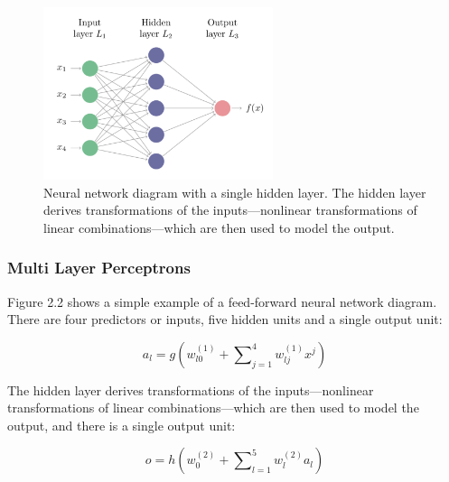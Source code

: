\begin{figure}[htbp]
\centering
\includegraphics[width=0.6\textwidth]{images/perceptron.png}
\caption{Neural network diagram with a single hidden layer. The hidden layer derives transformations of the inputs—nonlinear transformations of linear combinations—which are then used to model the output.}
\label{fig:perceptron}
\end{figure}

\subsubsection*{Multi Layer Perceptrons}

Figure 2.2 shows a simple example of a feed-forward neural network diagram. There are four predictors or inputs, five hidden units and a single output unit:

\begin{equation}
a_{l} =g\left( w^{( 1)}_{l0} +\sum\nolimits ^{4}_{j=1} w^{( 1)}_{lj} x^{j}\right)
\label{four input units and five hidden units}
\end{equation}

The hidden layer derives transformations of the
inputs—nonlinear transformations of linear combinations—which are then used to model the output, and there is a single output unit:

\begin{equation}
 o=h\left( w^{( 2)}_{0} +\sum\nolimits ^{5}_{l=1} w^{( 2)}_{l} a_{l}\right)
 \label{single output units}
\end{equation}

